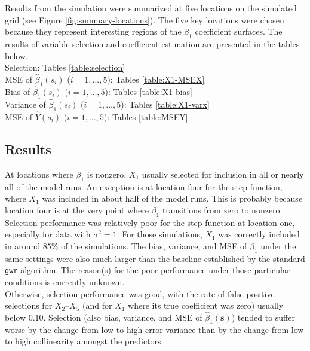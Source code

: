 \documentclass[authoryear, review, 11pt]{elsarticle}
\begin{document}
	
	Results from the simulation were summarized at five locations on the simulated grid (see Figure \ref{fig:summary-locations}). The five key locations were chosen because they represent interesting regions of the $\beta_1$ coefficient surfaces. The results of variable selection  and coefficient estimation  are presented in the tables below.\\	
	Selection: Tables \ref{table:selection}\\
	MSE of $\hat{\beta}_1(s_i)$ ($i = 1, \dots, 5$): Tables \ref{table:X1-MSEX}\\
	Bias of $\hat{\beta}_1(s_i)$ ($i = 1, \dots, 5$): Tables \ref{table:X1-bias}\\
	Variance of $\hat{\beta}_1(s_i)$ ($i = 1, \dots, 5$): Tables \ref{table:X1-varx}\\
	MSE of $\hat{Y}(s_i)$ ($i = 1, \dots, 5$): Tables \ref{table:MSEY}\\
	
	
		
	\subsection{Results}
	At locations where $\beta_1$ is nonzero, $X_1$ usually selected for inclusion in all or nearly all of the model runs. An exception is at location four for the step function, where $X_1$ was included in about half of the model runs. This is probably because location four is at the very point where $\beta_1$ transitions from zero to nonzero. Selection performance was relatively poor for the step function at location one, especially for data with $\sigma^2 = 1$. For those simulations, $X_1$ was correctly included in around 85\% of the simulations. The bias, variance, and MSE of $\hat{\beta}_1$ under the same settings were also much larger than the baseline established by the standard \verb!gwr! algorithm. The reason(s) for the poor performance under those particular conditions is currently unknown.\\
	
	Otherwise, selection performance was good, with the rate of false positive selections for $X_2$--$X_5$ (and for $X_1$ where its true coefficient was zero) usually below 0.10. Selection (also bias, variance, and MSE of $\hat{\beta}_1(\bm{s})$) tended to suffer worse by the change from low to high error variance than by the change from low to high collinearity amongst the predictors.\\
	
\end{document}
